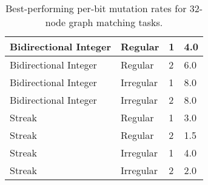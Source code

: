 \begin{table}[!htbp]
\begin{tabular}{l|l|l|l}
Bidirectional Integer & Regular                   & 1                      & 4.0                                            \\ \hline
Bidirectional Integer & Regular                   & 2                      & 6.0                                            \\ \hline
Bidirectional Integer & Irregular                 & 1                      & 8.0                                            \\ \hline
Bidirectional Integer & Irregular                 & 2                      & 8.0                                            \\ \hline
Streak                & Regular                   & 1                      & 3.0                                            \\ \hline
Streak                & Regular                   & 2                      & 1.5                                            \\ \hline
Streak                & Irregular                 & 1                      & 4.0                                            \\ \hline
Streak                & Irregular                 & 2                      & 2.0
\end{tabular}

\caption{
Best-performing per-bit mutation rates for 32-node graph matching tasks.
}
\label{tab:evo_graph_mut}

\end{table}
